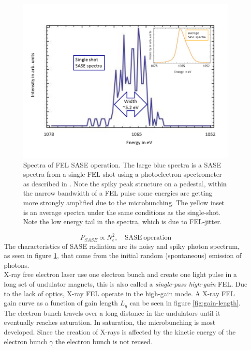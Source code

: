 \begin{figure}
	\centering
		\includegraphics[width=1.00\textwidth]{images/SASE-spectra.png}
	\caption[Spectra of FEL SASE operation.]{Spectra of FEL SASE operation. The large blue spectra is a SASE spectra from a single FEL shot using a photoelectron spectrometer as described in \citep{Bucher-2014-Unpublished}. Note the spiky peak structure on a pedestal, within the narrow bandwidth of a FEL pulse some energies are getting more strongly amplified due to the microbunching. The yellow inset is an average spectra under the same conditions as the single-shot. Note the low energy tail in the spectra, which is due to FEL-jitter.}
	\label{fig:SASE-spectra}
\end{figure}
\begin{equation}
P_{SASE} \propto N_{e}^{2},\quad \mathrm{SASE\ operation}
\end{equation}
The characteristics of SASE radiation are its noisy and spiky photon spectrum, as seen in figure \ref{fig:SASE-spectra}, that come from the initial random (spontaneous) emission of photons.\\
X-ray free electron laser use one electron bunch and create one light pulse in a long set of undulator magnets, this is also called a \textit{single-pass high-gain} FEL. Due to the lack of optics, X-ray FEL operate in the high-gain mode. A X-ray FEL gain curve as a function of gain length $L_{g}$ can be seen in figure \ref{fig:gain-length}. The electron bunch travels over a long distance in the undulators until it eventually reaches saturation. In saturation, the microbunching is most developed. Since the creation of X-rays is affected by the kinetic energy of the electron bunch $\gamma$ the electron bunch is not reused.
